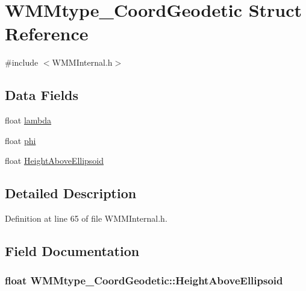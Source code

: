 \hypertarget{struct_w_m_mtype___coord_geodetic}{\section{\-W\-M\-Mtype\-\_\-\-Coord\-Geodetic \-Struct \-Reference}
\label{struct_w_m_mtype___coord_geodetic}
}


{\ttfamily \#include $<$\-W\-M\-M\-Internal.\-h$>$}

\subsection*{\-Data \-Fields}
\begin{DoxyCompactItemize}
\item 
float \hyperlink{struct_w_m_mtype___coord_geodetic_aaf9acfaad6b8964779cbd7f0bfa96170}{lambda}
\item 
float \hyperlink{struct_w_m_mtype___coord_geodetic_a830561cbe026055e7aadb6c004b31f08}{phi}
\item 
float \hyperlink{struct_w_m_mtype___coord_geodetic_ad607d07209c8321f31ff85601254410b}{\-Height\-Above\-Ellipsoid}
\end{DoxyCompactItemize}


\subsection{\-Detailed \-Description}


\-Definition at line 65 of file \-W\-M\-M\-Internal.\-h.



\subsection{\-Field \-Documentation}
\hypertarget{struct_w_m_mtype___coord_geodetic_ad607d07209c8321f31ff85601254410b}{
\subsubsection[{\-Height\-Above\-Ellipsoid}]{\setlength{\rightskip}{0pt plus 5cm}float {\bf \-W\-M\-Mtype\-\_\-\-Coord\-Geodetic\-::\-Height\-Above\-Ellipsoid}}}\label{struct_w_m_mtype___coord_geodetic_ad607d07209c8321f31ff85601254410b}


